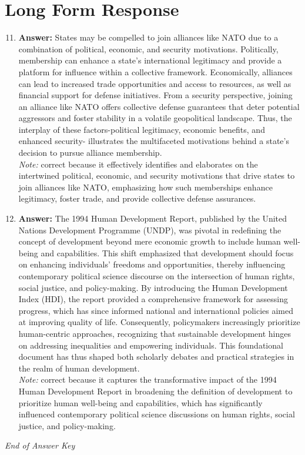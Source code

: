 \documentclass[12pt]{article}
\begin{document}
\section*{Long Form Response}
\begin{enumerate}[label=\arabic*.]
\setcounter{enumi}{10}
\item \textbf{Answer:} States may be compelled to join alliances like NATO due to a combination of political, economic, and security motivations. Politically, membership can enhance a state's international legitimacy and provide a platform for influence within a collective framework. Economically, alliances can lead to increased trade opportunities and access to resources, as well as financial support for defense initiatives. From a security perspective, joining an alliance like NATO offers collective defense guarantees that deter potential aggressors and foster stability in a volatile geopolitical landscape. Thus, the interplay of these factors-political legitimacy, economic benefits, and enhanced security- illustrates the multifaceted motivations behind a state's decision to pursue alliance membership.
\\ \textit{Note:} correct because it effectively identifies and elaborates on the intertwined political, economic, and security motivations that drive states to join alliances like NATO, emphasizing how such memberships enhance legitimacy, foster trade, and provide collective defense assurances.
\item \textbf{Answer:} The 1994 Human Development Report, published by the United Nations Development Programme (UNDP), was pivotal in redefining the concept of development beyond mere economic growth to include human well-being and capabilities. This shift emphasized that development should focus on enhancing individuals' freedoms and opportunities, thereby influencing contemporary political science discourse on the intersection of human rights, social justice, and policy-making. By introducing the Human Development Index (HDI), the report provided a comprehensive framework for assessing progress, which has since informed national and international policies aimed at improving quality of life. Consequently, policymakers increasingly prioritize human-centric approaches, recognizing that sustainable development hinges on addressing inequalities and empowering individuals. This foundational document has thus shaped both scholarly debates and practical strategies in the realm of human development.
\\ \textit{Note:} correct because it captures the transformative impact of the 1994 Human Development Report in broadening the definition of development to prioritize human well-being and capabilities, which has significantly influenced contemporary political science discussions on human rights, social justice, and policy-making.
\end{enumerate}

\vfill
\noindent\textit{End of Answer Key}
\end{document}
